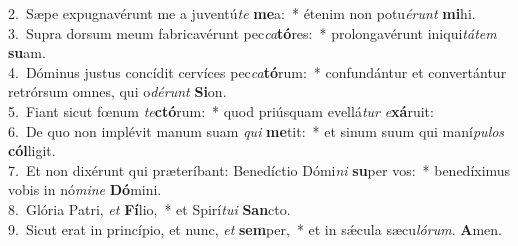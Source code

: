 {2.~}Sæpe expugnavérunt me a juventú\textit{te} \textbf{me}a:~* étenim non potu\textit{é}\textit{runt} \textbf{mi}hi.\\
{3.~}Supra dorsum meum fabricavérunt pec\textit{ca}\textbf{tó}res:~* prolongavérunt iniqui\textit{tá}\textit{tem} \textbf{su}am.\\
{4.~}Dóminus justus concídit cervíces pec\textit{ca}\textbf{tó}rum:~* confundántur et convertántur retrórsum omnes, qui o\textit{dé}\textit{runt} \textbf{Si}on.\\
{5.~}Fiant sicut fœnum \textit{te}\textbf{ctó}rum:~* quod priúsquam evellá\textit{tur} \textit{e}\textbf{xá}ruit:\\
{6.~}De quo non implévit manum suam \textit{qui} \textbf{me}tit:~* et sinum suum qui maní\textit{pu}\textit{los} \textbf{cól}ligit.\\
{7.~}Et non dixérunt qui præteríbant: Benedíctio Dómi\textit{ni} \textbf{su}per vos:~* benedíximus vobis in nó\textit{mi}\textit{ne} \textbf{Dó}mini.\\
{8.~}Glória Patri, \textit{et} \textbf{Fí}lio,~* et Spirí\textit{tu}\textit{i} \textbf{San}cto.\\
{9.~}Sicut erat in princípio, et nunc, \textit{et} \textbf{sem}per,~* et in sǽcula sæcu\textit{ló}\textit{rum}. \textbf{A}men.\\

